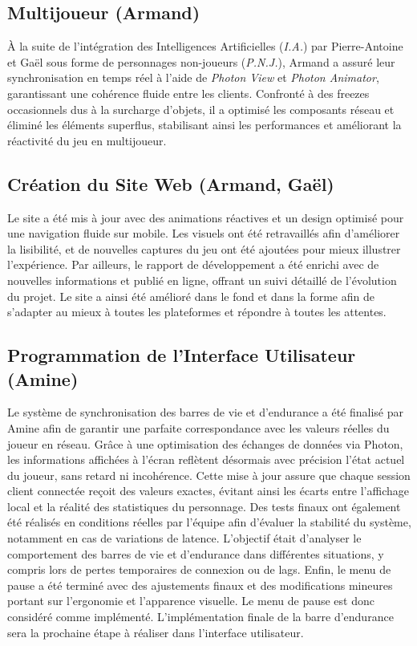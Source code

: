 \documentclass{report}
\begin{document}
\subsection*{Multijoueur (Armand)}
À la suite de l’intégration des Intelligences Artificielles (\textit{I.A.}) par Pierre-Antoine et Gaël sous forme de personnages non-joueurs (\textit{P.N.J.}), Armand a assuré leur synchronisation en temps réel à l’aide de \textit{Photon View} et \textit{Photon Animator}, garantissant une cohérence fluide entre les clients. Confronté à des freezes occasionnels dus à la surcharge d’objets, il a optimisé les composants réseau et éliminé les éléments superflus, stabilisant ainsi les performances et améliorant la réactivité du jeu en multijoueur.


\subsection*{Création du Site Web (Armand, Gaël)}
Le site a été mis à jour avec des animations réactives et un design optimisé pour une navigation fluide sur mobile. Les visuels ont été retravaillés afin d’améliorer la lisibilité, et de nouvelles captures du jeu ont été ajoutées pour mieux illustrer l’expérience. Par ailleurs, le rapport de développement a été enrichi avec de nouvelles informations et publié en ligne, offrant un suivi détaillé de l’évolution du projet. Le site a ainsi été amélioré dans le fond et dans la forme afin de s'adapter au mieux à toutes les plateformes et répondre à toutes les attentes.

\subsection*{Programmation de l'Interface Utilisateur (Amine)}
Le système de synchronisation des barres de vie et d’endurance a été finalisé par Amine afin de garantir une parfaite correspondance avec les valeurs réelles du joueur en réseau. Grâce à une optimisation des échanges de données via Photon, les informations affichées à l’écran reflètent désormais avec précision l’état actuel du joueur, sans retard ni incohérence. Cette mise à jour assure que chaque session client connectée reçoit des valeurs exactes, évitant ainsi les écarts entre l’affichage local et la réalité des statistiques du personnage. Des tests finaux ont également été réalisés en conditions réelles par l'équipe afin d’évaluer la stabilité du système, notamment en cas de variations de latence. L’objectif était d’analyser le comportement des barres de vie et d’endurance dans différentes situations, y compris lors de pertes temporaires de connexion ou de lags. Enfin, le menu de pause a été terminé avec des ajustements finaux et des modifications mineures portant sur l’ergonomie et l’apparence visuelle. Le menu de pause est donc considéré comme implémenté. L'implémentation finale de la barre d'endurance sera la prochaine étape à réaliser dans l'interface utilisateur.
\end{document}
